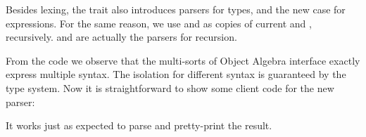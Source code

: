 Besides lexing, the trait  also introduces parsers for types, and the new case for expressions. For the same reason,
we use  and  as copies of current  and , recursively.  and  are actually the parsers for recursion.

From the code we observe that the multi-sorts of Object Algebra interface
exactly express multiple syntax. The isolation for different syntax
is guaranteed by the type system. Now it is straightforward to show some client code
for the new parser:

It works just as expected to parse and pretty-print the result.
